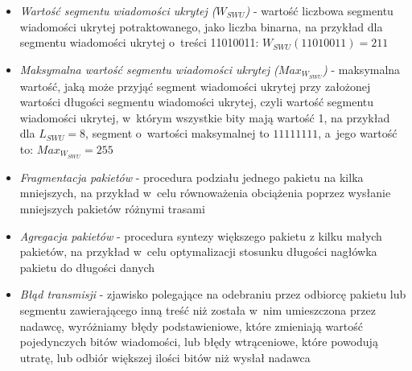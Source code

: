 \documentclass[a4paper, twoside, 12pt]{report}
\begin{document}
\begin{itemize}
        \item \emph{Wartość segmentu wiadomości ukrytej (\( W_{SWU} \))} - wartość
            liczbowa segmentu wiadomości ukrytej potraktowanego, jako liczba binarna,
            na przykład dla segmentu wiadomości ukrytej o~treści 11010011:
            \( W_{SWU}(11010011) = 211 \)

       \item \emph{Maksymalna wartość segmentu wiadomości ukrytej (\( Max_{W_{SWU}} \))} -
           maksymalna wartość, jaką może przyjąć segment wiadomości ukrytej przy
           założonej wartości długości segmentu wiadomości ukrytej, czyli wartość
           segmentu wiadomości ukrytej, w~którym wszystkie bity mają wartość 1,
           na przykład dla \( L_{SWU} = 8 \), segment o~wartości maksymalnej to
           \( 11111111 \), a~jego wartość to: \( Max_{W_{SWU}} = 255 \)

       \item \emph{Fragmentacja pakietów} - procedura podziału jednego pakietu na
           kilka mniejszych, na przykład w~celu równoważenia obciążenia poprzez
           wysłanie mniejszych pakietów różnymi trasami

       \item \emph{Agregacja pakietów} - procedura syntezy większego pakietu z
           kilku małych pakietów, na przykład w~celu optymalizacji stosunku długości
           nagłówka pakietu do długości danych

       \item \emph{Błąd transmisji} - zjawisko polegające na odebraniu przez odbiorcę
           pakietu lub segmentu zawierającego inną treść niż została w~nim
           umieszczona przez nadawcę, wyróżniamy błędy podstawieniowe, które
           zmieniają wartość pojedynczych bitów wiadomości, lub błędy wtrąceniowe,
           które powodują utratę, lub odbiór większej ilości bitów niż wysłał nadawca

    \end{itemize}
\end{document}
